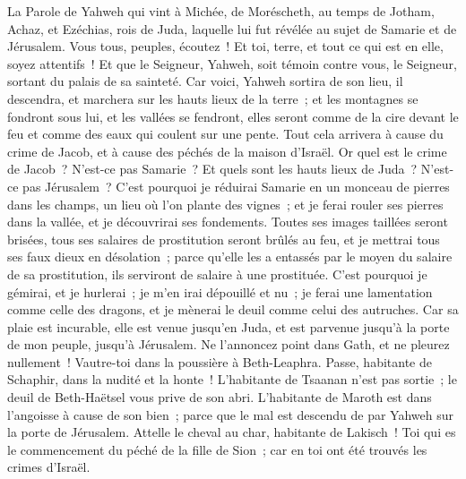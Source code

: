 \begin{multicols}{2}
\VerseOne{}La Parole de Yahweh qui vint à Michée, de Moréscheth, au temps de Jotham, Achaz, et Ezéchias, rois de Juda, laquelle  lui fut révélée au sujet de Samarie et de Jérusalem.
Vous tous, peuples, écoutez~! Et toi, terre, et tout ce qui est en elle, soyez attentifs~! Et que le Seigneur, Yahweh, soit témoin contre vous, le Seigneur, sortant du palais de sa sainteté.
Car voici, Yahweh sortira de son lieu, il descendra, et marchera sur les hauts lieux de la terre~;
et les montagnes se fondront sous lui, et les vallées se fendront, elles seront comme de la cire devant le feu et comme des eaux qui coulent sur une pente.
Tout cela arrivera à cause du crime de Jacob, et à cause des péchés de la maison d'Israël. Or quel est le crime de Jacob~? N'est-ce pas Samarie~? Et quels sont les hauts lieux de Juda~? N'est-ce pas Jérusalem~?
C'est pourquoi je réduirai Samarie en un monceau de pierres dans les champs, un lieu où l'on plante des vignes~; et je ferai rouler ses pierres dans la vallée, et je découvrirai ses fondements.
Toutes ses images taillées seront brisées, tous ses salaires de prostitution seront brûlés au feu, et je mettrai tous ses faux dieux en désolation~; parce qu'elle les a entassés par le moyen du salaire de sa prostitution, ils serviront de salaire à une prostituée.
C'est pourquoi je gémirai, et je hurlerai~; je m'en irai dépouillé et nu~; je ferai une lamentation comme celle des dragons, et je mènerai le deuil comme celui des autruches.
Car sa plaie est incurable, elle est venue jusqu'en Juda, et est parvenue jusqu'à la porte de mon peuple, jusqu'à Jérusalem.
Ne l'annoncez point dans Gath, et ne pleurez nullement~! Vautre-toi dans la poussière à Beth-Leaphra.
Passe, habitante de Schaphir, dans la nudité et la honte~! L'habitante de Tsaanan n'est pas sortie~; le deuil de Beth-Haëtsel vous prive de son abri.
L'habitante de Maroth est dans l'angoisse à cause de son bien~; parce que le mal est descendu de par Yahweh sur la porte de Jérusalem.
Attelle le cheval au char, habitante de Lakisch~! Toi qui es le commencement du péché de la fille de Sion~; car en toi ont été trouvés les crimes d'Israël.

\end{multicols}
